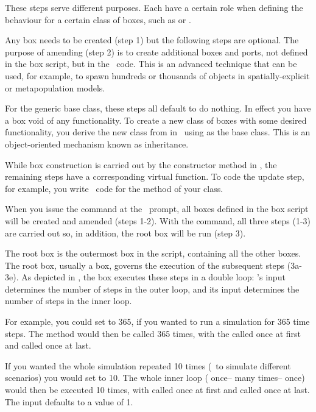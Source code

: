 These steps serve different  purposes. Each have a certain role when  defining the behaviour for a certain class of boxes, such as  or . 

Any box needs to be created (step 1) but the following steps are optional. The purpose of amending (step 2) is to create additional boxes and ports, not defined in the box script, but in the \CPP\ code. This is an advanced technique that can be used, for example, to spawn hundreds or thousands of  objects in spatially-explicit or metapopulation models.

For the generic  base class, these steps all default to do nothing. In effect you have a box void of any functionality. To create a new class of boxes with some desired functionality, you derive the new class from  in \CPP\ using  as the base class. This is an object-oriented mechanism known as  inheritance.

While box construction is carried out by the constructor method in \CPP, the remaining steps have a corresponding virtual function. To code the update step, for example, you write \CPP\ code for the  method of your class.

When you issue the  command at the \US\ prompt, all boxes defined in the box script will be created and amended (steps 1-2). With the  command, all three steps (1-3) are carried out so, in addition, the root box will be run (step 3). 

The root box is the outermost box in the script, containing all the other boxes. The root box, usually a  box, governs the execution of the subsequent steps (3a-3e). As depicted in , the  box executes these steps in a double loop: 's  input determines the number of steps in the outer loop, and its  input determines the number of steps in the inner loop.

For example, you could set  to 365, if you wanted to run a simulation for 365 time steps. The  method would then be called 365 times, with the  called once at first and  called once at last.

If you wanted the whole simulation repeated 10 times (\eg\ to simulate different scenarios)  you would set  to 10. The whole inner loop ( once-- many times-- once) would then be executed 10 times, with  called once at first and  called once at last. The  input defaults to a value of 1. 

